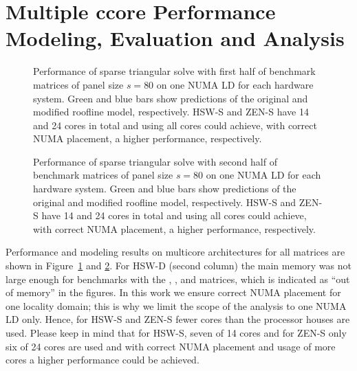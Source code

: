 
\section{Multiple ccore Performance Modeling, Evaluation and Analysis}
\label{sec:performance:multicore}

\begin{figure}[tp]%
  \centering%
  \begin{adjustbox}{angle=90}
  \end{adjustbox}
  \caption{Performance of sparse triangular solve with first half of benchmark matrices of
panel size $s=80$ on one NUMA LD for each hardware system.
  Green and blue bars show predictions of the original and modified roofline
model, respectively.
  HSW-S and ZEN-S have 14 and 24 cores in total and using all cores could
achieve, with correct NUMA placement, a higher performance, respectively.}
  \label{fig:p:pardiso-1}
\end{figure}

\begin{figure}[tp]%
  \centering%
  \begin{adjustbox}{angle=90}
  \end{adjustbox}
  \caption{Performance of sparse triangular solve with second half of benchmark matrices of
panel size $s=80$ on one NUMA LD for each hardware system.
  Green and blue bars show predictions of the original and modified roofline
model, respectively.
  HSW-S and ZEN-S have 14 and 24 cores in total and using all cores could
achieve, with correct NUMA placement, a higher performance, respectively.}
  \label{fig:p:pardiso-2}
\end{figure}

Performance and modeling results on multicore architectures for all matrices are shown in Figure~\ref{fig:p:pardiso-1} and \ref{fig:p:pardiso-2}.
For HSW-D (second column) the main memory was not large enough for benchmarks
with the , , and  matrices, which is
indicated as ``out of memory'' in the figures.
%
%
In this work we ensure correct NUMA placement for one locality domain; this is why
we limit the scope of the analysis to one NUMA LD only. 
Hence, for HSW-S and ZEN-S fewer cores than the processor houses are used.
Please keep in mind that for HSW-S, seven of 14 cores and for ZEN-S only six of
24 cores are used and with correct NUMA placement and usage of more cores a
higher performance could be achieved.

